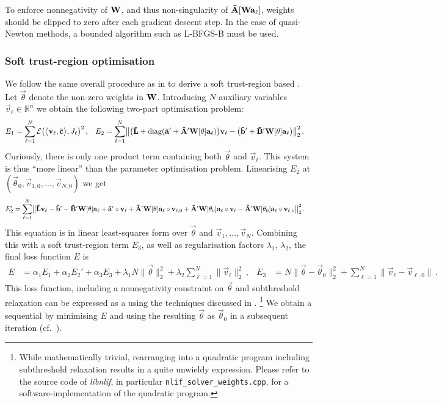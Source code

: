 To enforce nonnegativity of $\mathbf{W}$, and thus non-singularity of $\mathbf{\tilde A}[\mathbf{W} \mathbf{a}_\ell]$, weights should be clipped to zero after each gradient descent step.
In the case of quasi-Newton methods, a bounded algorithm such as L-BFGS-B must be used.

\subsubsection{Soft trust-region optimisation}
We follow the same overall procedure as in  to derive a soft trust-region based \SQP.
Let $\vec \theta$ denote the non-zero weights in $\mathbf{W}$.
Introducing $N$ auxiliary variables $\vec v_\ell \in \mathbb{R}^n$ we obtain the following two-part optimisation problem:
\begin{align*}
	E_1 &= \sum_{\ell = 1}^N \mathcal{E}\bigl(
   	   	\bigl\langle
   	   		\mathbf{v}_\ell,
   	   		\mathbf{\tilde c}
   	   	\bigr\rangle, J_\ell \bigr)^2 \,, &
	E_2 &= \sum_{\ell = 1}^N  \bigl\|
		\bigl(\mathbf{\tilde L} + \operatorname{\mathrm{diag}}(\mathbf{\tilde a}' + \mathbf{\tilde A}' \mathbf{W}[\mathbf{\theta}] \mathbf{a}_\ell) \bigr) \mathbf{v}_\ell - \bigl(\mathbf{\tilde b}' + \mathbf{\tilde B}' \mathbf{W}[\mathbf{\theta}] \mathbf{a}_\ell \bigr) \bigr\|_2^2
	\,.
\end{align*}
Curiously, there is only one product term containing both $\vec \theta$ and $\vec v_\ell$.
This system is thus \enquote{more linear} than the parameter optimisation problem.
Linearising $E_2$ at $(\vec \theta_0, \vec v_{1, 0}, \ldots, \vec v_{N, 0})$ we get
\begin{align*}
	E_2' &= \sum_{\ell = 1}^N  \bigl\|
		  \mathbf{\tilde L} \mathbf{v}_\ell
		- \mathbf{\tilde b}'
		- \mathbf{\tilde B}' \mathbf{W}[\mathbf{\theta}] \mathbf{a}_\ell
		+ \mathbf{\tilde a}' \circ \mathbf{v}_\ell
		+ \mathbf{\tilde A}' \mathbf{W}[\mathbf{\theta}] \mathbf{a}_\ell \circ \mathbf{v}_{\ell, 0}
		+ \mathbf{\tilde A}' \mathbf{W}[\mathbf{\theta}_0] \mathbf{a}_\ell \circ \mathbf{v}_\ell
		- \mathbf{\tilde A}' \mathbf{W}[\mathbf{\theta}_0] \mathbf{a}_\ell \circ \mathbf{v}_{\ell, 0}
	\bigr\|_2^2 \,.
\end{align*}
This equation is in linear least-squares form over $\vec \theta$ and $\vec v_1, \ldots, \vec v_N$.
Combining this with a soft trust-region term $E_3$, as well as regularisation factors $\lambda_1$, $\lambda_2$, the final loss function $E$ is
\begin{align}
	E &= \alpha_1 E_1 + \alpha_2 E_2' + \alpha_3 E_3 + \lambda_1 N \|\vec \theta\|_2^2 + \lambda_2 \sum_{\ell = 1}^N \| \vec v_\ell \|_2^2 \,, &
	E_3 &= N \|\vec \theta - \vec \theta_0 \|_2^2 + \sum_{\ell = 1}^N \| \vec v_\ell - \vec v_{\ell, 0} \| \,.
	\label{eqn:nlif_weight_sqp}
\end{align}
This loss function, including a nonnegativity constraint on $\vec \theta$ and subthreshold relaxation can be expressed as a \QP using the techniques discussed in .%
\footnote{While mathematically trivial, rearranging  into a quadratic program including subthreshold relaxation results in a quite unwieldy expression.
Please refer to the source code of \emph{libnlif}, in particular \texttt{nlif\_solver\_weights.cpp}, for a software-implementation of the quadratic program.}
We obtain a sequential \QP by minimising $E$ and using the resulting $\vec \theta$ as $\vec \theta_0$ in a subsequent iteration (cf.~).

